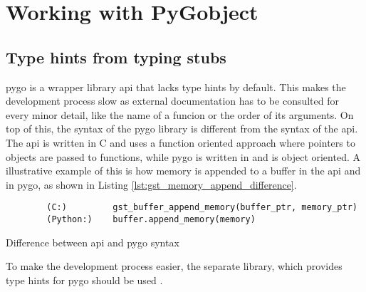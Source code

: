 \section{Working with PyGobject}


\subsection{Type hints from typing stubs}
\gls{pygo} is a wrapper library \gs \gls{api} that lacks type hints by default.
This makes the development process slow as external documentation has to be consulted for every minor detail, like the name of a funcion or the order of its arguments.
On top of this, the syntax of the \gls{pygo} library is different from the syntax of the \gs \gls{api}.
The \gls{api} is written in C and uses a function oriented approach where pointers to objects are passed to functions, while \gls{pygo} is written in \py and is object oriented.
A illustrative example of this is how memory is appended to a buffer in the \gs \gls{api} and in \gls{pygo}, as shown in Listing \ref{lst:gst_memory_append_difference}.
\begin{listing}[H]
    \begin{verbatim}
        (C:)         gst_buffer_append_memory(buffer_ptr, memory_ptr)
        (Python:)    buffer.append_memory(memory)
    \end{verbatim}
    \caption{Difference between \gs \gls{api} and \gls{pygo} syntax}
    \label{lst:gst_memory_append_difference}
\end{listing}
To make the development process easier, the separate  library, which provides type hints for \gls{pygo} should be used \cite{pygobjectTypingStubsPyGObject2023}.
